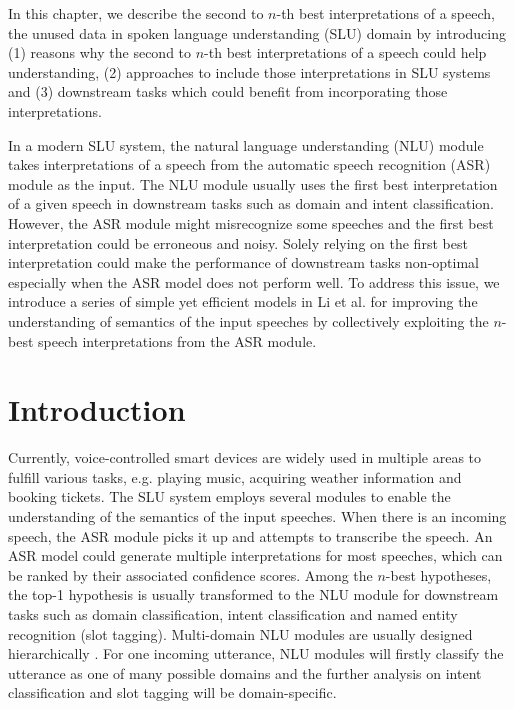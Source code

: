 In this chapter, we describe  the second to $n$-th best interpretations of a speech, the unused data in spoken language understanding (SLU)  domain by introducing (1) reasons why the second to $n$-th best interpretations of a speech could help understanding, (2) approaches to include those interpretations in SLU systems and (3)  downstream tasks which could benefit from incorporating those interpretations. 

In a modern SLU system, the natural language understanding (NLU) module takes interpretations of a speech from the automatic speech recognition (ASR) module as the input. The NLU module usually uses the first best interpretation of a given speech in downstream tasks such as domain and intent classification. However, the ASR module might misrecognize some speeches and the first best interpretation could be erroneous and noisy. Solely relying on the first best interpretation could make the performance of downstream tasks non-optimal especially when the ASR model does not perform well. To address this issue, we introduce a series of simple yet efficient models in Li et al. \citep{li2020improving}  for improving the understanding of semantics of the input speeches by collectively exploiting the $n$-best speech interpretations from the ASR module. 

\section{Introduction}
\label{alexa:intro}
Currently, voice-controlled smart devices are widely used in multiple areas to fulfill various tasks, e.g. playing music, acquiring weather information and booking tickets. 
The SLU system employs several modules to enable the understanding of the semantics of the input speeches. 
When there is an incoming speech, the ASR module picks it up and attempts to transcribe the speech.
An ASR model could generate multiple interpretations for most speeches, which can be ranked by their associated confidence scores.
Among the $n$-best hypotheses, the top-1 hypothesis is usually transformed to the NLU module for downstream tasks such as domain classification, intent classification and named entity recognition (slot tagging). Multi-domain NLU modules are usually designed hierarchically \citep{tur2011spoken}. For one incoming utterance, NLU modules will firstly classify the utterance as one of many possible domains and the further analysis on intent classification and slot tagging will be domain-specific.


